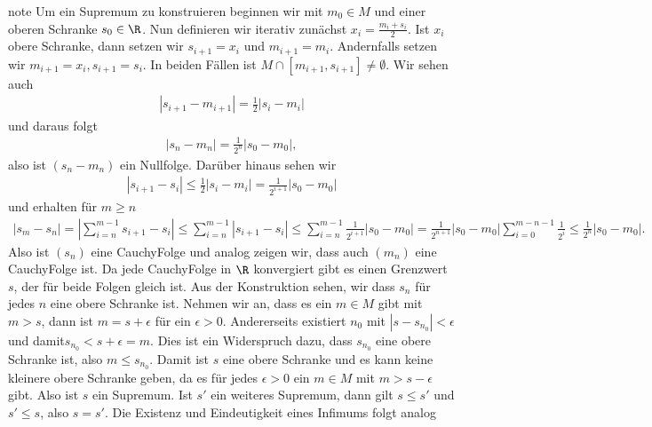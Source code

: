 \documentclass[letterpaper,10pt,english]{jupyterBook}
\begin{document}
\begin{sphinxadmonition}{note}
Um ein Supremum zu konstruieren beginnen wir mit \(m_0 \in M\) und einer oberen Schranke \(s_0 \in \R\). Nun definieren wir iterativ zunächst \(x_i=\frac{m_i+s_i}2\). Ist \(x_i\) obere Schranke, dann setzen wir \(s_{i+1}=x_i\) und \(m_{i+1}=m_i\). Andernfalls setzen wir \(m_{i+1}=x_i, s_{i+1}=s_i\). In beiden Fällen ist \(M \cap [m_{i+1},s_{i+1}] \neq \emptyset\). Wir sehen auch
\begin{equation*}
\begin{split}|s_{i+1} - m_{i+1}| = \frac{1}2 |s_i - m_i|\end{split}
\end{equation*}
und daraus folgt
\begin{equation*}
\begin{split}|s_n - m_n| = \frac{1}{2^n} |s_0-m_0|,\end{split}
\end{equation*}
also ist \((s_n-m_n)\) ein Nullfolge. Darüber hinaus sehen wir
\begin{equation*}
\begin{split} |s_{i+1}-s_i| \leq \frac{1}2 |s_i - m_i|  = \frac{1}{2^{i+1}} |s_0-m_0|\end{split}
\end{equation*}
und erhalten für \(m\geq n\)
\begin{equation*}
\begin{split} |s_m - s_n| = |\sum_{i=n}^{m-1} s_{i+1}-s_i| \leq \sum_{i=n}^{m-1} |s_{i+1}-s_i| \leq  \sum_{i=n}^{m-1}\frac{1}{2^{i+1}} |s_0-m_0| = \frac{1}{2^{n+1}}  |s_0-m_0| \sum_{i=0}^{m-n-1}\frac{1}{2^{i}} \leq \frac{1}{2^{n}}  |s_0-m_0|.\end{split}
\end{equation*}
Also ist \((s_n)\) eine Cauchy\sphinxhyphen{}Folge und analog zeigen wir, dass auch \((m_n)\) eine Cauchy\sphinxhyphen{}Folge ist. Da jede Cauchy\sphinxhyphen{}Folge in \(\R\) konvergiert gibt es einen Grenzwert \(s\), der für beide Folgen gleich ist. Aus der Konstruktion sehen, wir dass \(s_n\) für jedes \(n\) eine obere Schranke ist. Nehmen wir an, dass es ein \(m \in M\) gibt mit \(m > s\), dann ist \(m=s+\epsilon\) für ein \(\epsilon > 0\). Andererseits existiert \(n_0\) mit \(|s-s_{n_0}|< \epsilon\) und damit\(s_{n_0} < s + \epsilon = m\). Dies ist ein Widerspruch dazu, dass \(s_{n_0}\) eine obere Schranke ist, also \(m \leq s_{n_0}\). Damit ist \(s\) eine obere Schranke und es kann keine kleinere obere Schranke geben, da es für jedes \(\epsilon > 0\) ein \(m \in M\) mit \(m > s-\epsilon\) gibt. Also ist \(s\) ein Supremum. Ist \(s'\) ein weiteres Supremum, dann gilt \(s \leq s'\) und \(s' \leq s\), also \(s=s'\). Die Existenz und Eindeutigkeit eines Infimums folgt analog
\end{sphinxadmonition}
\end{document}
